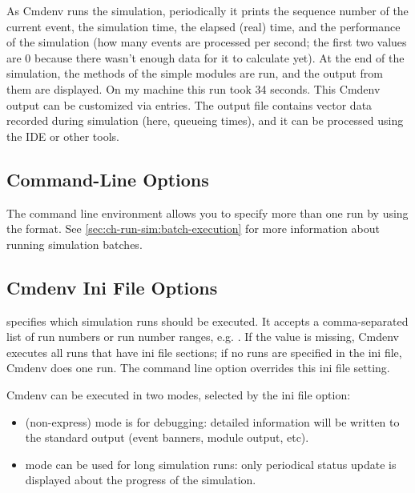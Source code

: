 As Cmdenv runs the simulation, periodically it prints the sequence number
of the current event, the simulation time, the elapsed (real) time,
and the performance of the simulation (how many events are processed per
second; the first two values are 0 because there wasn't enough data
for it to calculate yet). At the end of the simulation, the 
methods of the simple modules are run, and the output from them are displayed.
On my machine this run took 34 seconds. This Cmdenv output can be
customized via  entries. The output file 
contains vector data recorded during simulation (here, queueing times),
and it can be processed using the IDE or other tools.

\subsection{Command-Line Options}

The command line environment allows you to specify more than one run by
using the  format. See \ref{sec:ch-run-sim:batch-execution}
for more information about running simulation batches.

\subsection{Cmdenv Ini File Options}
\label{sec:ch-run-sim:cmdenv-section}

 specifies which simulation runs should be executed.
It accepts a comma-separated list of run numbers or run number ranges, e.g.
. If the value is missing, Cmdenv executes all runs that have
ini file sections; if no runs are specified in the ini file, Cmdenv does one run.
The  command line option overrides this ini file setting.


Cmdenv can be executed in two modes, selected by the 
ini file option:

\begin{itemize}
    \item {} (non-express) mode is for debugging: detailed information
        will be written to the standard output (event banners, module output,
        etc).
    \item {} mode can be used for long simulation runs: only
        periodical status update is displayed about the progress of the
        simulation.
\end{itemize}

